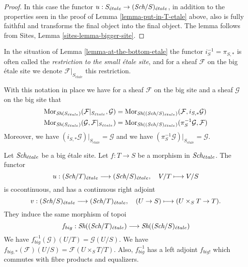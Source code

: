 \begin{proof}
In this case the functor
$u : S_{\acute{e}tale} \to (\textit{Sch}/S)_{\acute{e}tale}$,
in addition to the properties seen in the proof of
Lemma \ref{lemma-put-in-T-etale} above, also is fully faithful
and transforms the final object into the final object.
The lemma follows from Sites, Lemma \ref{sites-lemma-bigger-site}.
\end{proof}

\begin{definition}
\label{definition-restriction-small-etale}
In the situation of
Lemma \ref{lemma-at-the-bottom-etale}
the functor $i_S^{-1} = \pi_{S, *}$ is often
called the {\it restriction to the small \'etale site}, and for a sheaf
$\mathcal{F}$ on the big \'etale site we denote
$\mathcal{F}|_{S_{\acute{e}tale}}$ this restriction.
\end{definition}

\noindent
With this notation in place we have for a sheaf $\mathcal{F}$ on the
big site and a sheaf $\mathcal{G}$ on the big site that
\begin{align*}
\mathop{\rm Mor}\nolimits_{\mathop{\textit{Sh}}\nolimits(S_{\acute{e}tale})}(
\mathcal{F}|_{S_{\acute{e}tale}},
\mathcal{G})
& =
\mathop{\rm Mor}\nolimits_{\mathop{\textit{Sh}}\nolimits((\textit{Sch}/S)_{\acute{e}tale})}(
\mathcal{F},
i_{S, *}\mathcal{G}) \\
\mathop{\rm Mor}\nolimits_{\mathop{\textit{Sh}}\nolimits(S_{\acute{e}tale})}(
\mathcal{G},
\mathcal{F}|_{S_{\acute{e}tale}})
& =
\mathop{\rm Mor}\nolimits_{\mathop{\textit{Sh}}\nolimits((\textit{Sch}/S)_{\acute{e}tale})}(
\pi_S^{-1}\mathcal{G},
\mathcal{F})
\end{align*}
Moreover, we have $(i_{S, *}\mathcal{G})|_{S_{\acute{e}tale}} = \mathcal{G}$
and we have $(\pi_S^{-1}\mathcal{G})|_{S_{\acute{e}tale}} = \mathcal{G}$.

\begin{lemma}
\label{lemma-morphism-big-etale}
Let $\textit{Sch}_{\acute{e}tale}$ be a big \'etale site.
Let $f : T \to S$ be a morphism in $\textit{Sch}_{\acute{e}tale}$.
The functor
$$
u :
(\textit{Sch}/T)_{\acute{e}tale}
\longrightarrow
(\textit{Sch}/S)_{\acute{e}tale},
\quad
V/T \longmapsto V/S
$$
is cocontinuous, and has a continuous right adjoint
$$
v :
(\textit{Sch}/S)_{\acute{e}tale}
\longrightarrow
(\textit{Sch}/T)_{\acute{e}tale},
\quad
(U \to S) \longmapsto (U \times_S T \to T).
$$
They induce the same morphism of topoi
$$
f_{big} :
\mathop{\textit{Sh}}\nolimits((\textit{Sch}/T)_{\acute{e}tale})
\longrightarrow
\mathop{\textit{Sh}}\nolimits((\textit{Sch}/S)_{\acute{e}tale})
$$
We have $f_{big}^{-1}(\mathcal{G})(U/T) = \mathcal{G}(U/S)$.
We have $f_{big, *}(\mathcal{F})(U/S) = \mathcal{F}(U \times_S T/T)$.
Also, $f_{big}^{-1}$ has a left adjoint $f_{big!}$ which commutes with
fibre products and equalizers.
\end{lemma}

